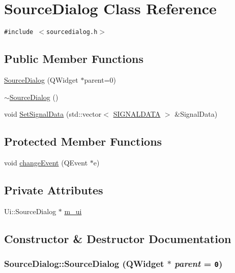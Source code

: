 \hypertarget{class_source_dialog}{
\section{SourceDialog Class Reference}
\label{class_source_dialog}
}
{\tt \#include $<$sourcedialog.h$>$}

\subsection*{Public Member Functions}
\begin{CompactItemize}
\item 
\hyperlink{class_source_dialog_1c6da1c386781aff04c717b413614c4f}{SourceDialog} (QWidget $\ast$parent=0)
\item 
\hyperlink{class_source_dialog_f2d3c9ead8959ec6c3f73284db63b400}{$\sim$SourceDialog} ()
\item 
void \hyperlink{class_source_dialog_323288d35c5ae02a9b4ac6450d2eb3de}{SetSignalData} (std::vector$<$ \hyperlink{class_s_i_g_n_a_l_d_a_t_a}{SIGNALDATA} $>$ \&SignalData)
\end{CompactItemize}
\subsection*{Protected Member Functions}
\begin{CompactItemize}
\item 
void \hyperlink{class_source_dialog_90ae03b903842b3d703872b351e871bc}{changeEvent} (QEvent $\ast$e)
\end{CompactItemize}
\subsection*{Private Attributes}
\begin{CompactItemize}
\item 
Ui::SourceDialog $\ast$ \hyperlink{class_source_dialog_c831372ff1959faa98c6336e2384974f}{m\_\-ui}
\end{CompactItemize}


\subsection{Constructor \& Destructor Documentation}
\hypertarget{class_source_dialog_1c6da1c386781aff04c717b413614c4f}{
\subsubsection[{SourceDialog}]{\setlength{\rightskip}{0pt plus 5cm}SourceDialog::SourceDialog (QWidget $\ast$ {\em parent} = {\tt 0})}}
\label{class_source_dialog_1c6da1c386781aff04c717b413614c4f}


